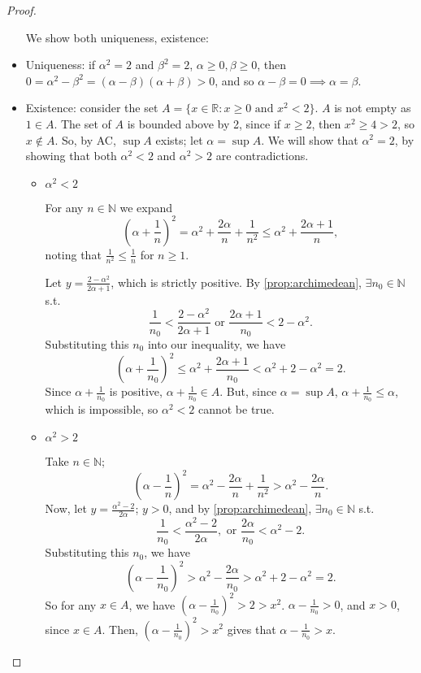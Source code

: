\documentclass[12pt]{article}
\begin{document}
\begin{proof}

  \begin{itemize}
    We show both uniqueness, existence:\footnotemark
    \item Uniqueness: if $\alpha^2 = 2$ and $\beta^2 = 2$, $\alpha \geq 0, \beta \geq 0$, then $0= \alpha^2 - \beta^2 = (\alpha - \beta)(\alpha + \beta) > 0$, and so $\alpha - \beta = 0 \implies \alpha = \beta$.
    \item Existence: consider the set $A = \{x \in \mathbb{R} : x \geq 0 \text{ and } x^2 < 2\}$. $A$ is not empty as $1 \in A$. The set of $A$ is bounded above by 2, since if $x \geq 2$, then $x^2 \geq 4 > 2$, so $x \notin A$. So, by AC, $\sup A$ exists; let $\alpha = \sup A$. We will show that $\alpha^2 = 2$, by showing that both $\alpha^2 < 2$ and $\alpha^2 > 2$ are contradictions.
    
    \begin{itemize}[label=]
      \item $\alpha^2 < 2$
    
      For any $n \in \mathbb{N}$ we expand \[\left(\alpha + \frac{1}{n}\right)^2 = \alpha^2 + \frac{2\alpha}{n} + \frac{1}{n^2} \leq \alpha^2 + \frac{2 \alpha + 1}{n},\] noting that $\frac{1}{n^2} \leq \frac{1}{n}$ for $n \geq 1$.

      Let $y = \frac{2 - \alpha^2}{2\alpha + 1}$, which is strictly positive. By \cref{prop:archimedean}, $\exists n_0 \in \mathbb{N}$ s.t. \[\frac{1}{n_0} < \frac{2-\alpha^2}{2\alpha + 1} \text{ or } \frac{2\alpha + 1}{n_0} < 2 - \alpha^2.\] Substituting this $n_0$ into our inequality, we have \[\left(\alpha + \frac{1}{n_0}\right)^2 \leq \alpha^2 + \frac{2 \alpha + 1}{n_0} < \alpha^2 + 2 - \alpha^2 = 2.\] Since $\alpha + \frac{1}{n_0}$ is positive, $\alpha + \frac{1}{n_0} \in A$. But, since $\alpha = \sup A$, $\alpha + \frac{1}{n_0} \leq \alpha$, which is impossible, so $\alpha^2 < 2$ cannot be true.
      \item $\alpha^2 > 2$
      
      Take $n \in \mathbb{N}$; \[\left(\alpha - \frac{1}{n}\right)^2 = \alpha^2 - \frac{2\alpha}{n} + \frac{1}{n^2} > \alpha^2 - \frac{2\alpha}{n}.\] Now, let $y = \frac{\alpha^2 - 2}{2\alpha}$; $y > 0$, and by \cref{prop:archimedean}, $\exists n_0 \in \mathbb{N}$ s.t. \[\frac{1}{n_0} < \frac{\alpha^2 - 2}{2 \alpha}, \text{ or } \frac{2\alpha}{n_0} < \alpha^2 - 2.\] Substituting this $n_0$, we have \[\left(\alpha - \frac{1}{n_0}\right)^2 > \alpha^2 - \frac{2 \alpha}{n_0} > \alpha^2 + 2 - \alpha^2 = 2.\] So for any $x \in A$, we have $\left(\alpha- \frac{1}{n_0}\right)^2 > 2 > x^2$. $\alpha - \frac{1}{n_0}> 0$, and $x > 0$, since $x \in A$. Then, $\left(\alpha - \frac{1}{n_0}\right)^2 > x^2$ gives that $\alpha - \frac{1}{n_0}>x$.


\end{itemize}
\end{itemize}
\end{proof}
\end{document}
